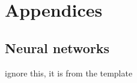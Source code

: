 \chapter{Appendices}

\section{Neural networks
	\label{anx.cfg}}

ignore this, it is from the template

 